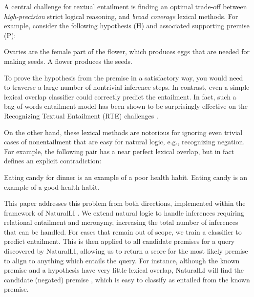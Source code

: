 A central challenge for textual entailment is finding an optimal trade-off between
  \textit{high-precision} strict logical reasoning, and \textit{broad coverage}
  lexical methods.
For example, consider the following hypothesis (H) and associated supporting premise (P):

\entailmentExample
{Ovaries are the female part of the flower, which produces eggs that are needed for making seeds.}
{A flower produces the seeds.}

To prove the hypothesis from the premise in a satisfactory way, you would need
  to traverse a large number of nontrivial inference steps.
In contrast, even a simple lexical overlap classifier could correctly predict
  the entailment.
In fact, such a bag-of-words entailment model has been shown to be surprisingly
  effective on the Recognizing Textual Entailment (RTE) challenges 
  \cite{key:2009maccartney-thesis}.

On the other hand, these lexical methods are notorious for ignoring even trivial 
  cases of nonentailment that are easy for natural logic, e.g., recognizing negation.
For example, the following pair has a near perfect lexical overlap, but in fact defines
  an explicit contradiction:

\entailmentExample
{Eating candy for dinner is an example of a poor health habit.}
{Eating candy is an example of a good health habit.}


This paper addresses this problem from both directions, implemented within the
  framework of NaturalLI \cite{key:2014angeli-naturalli}.
We extend natural logic to handle inferences requiring relational entailment 
  and meronymy, increasing the total number of inferences that can be handled.
For cases that remain out of scope, we train a classifier to predict 
  entailment.
This is then applied to all candidate premises for a query discovered by 
  NaturalLI, allowing us to return a score for the most likely premise to
  align to anything which entails the query.
For instance, although the known premise  
  and a hypothesis  
  have very little lexical overlap, NaturalLI
  will find the candidate (negated) premise ,
  which is easy to classify as entailed from the known premise.
  
